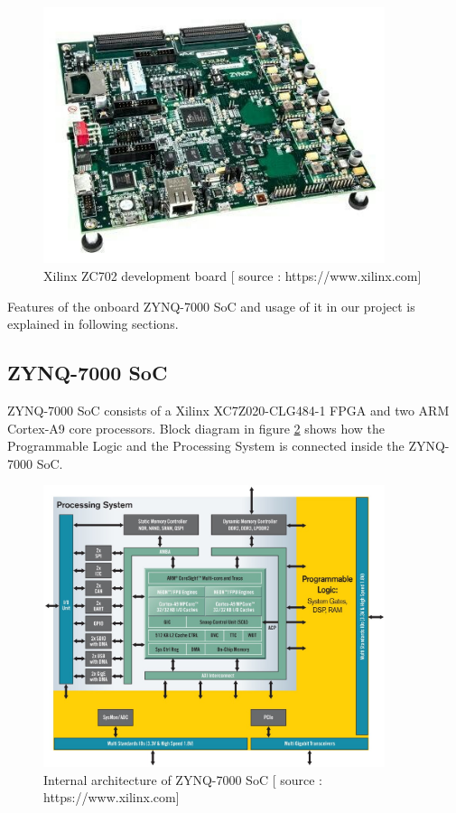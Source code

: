 \documentclass[12pt,a4paper]{report}
\begin{document}
\begin{figure}[H]
\includegraphics[width=10cm]{zc702.jpg}
\centering
\caption{Xilinx ZC702 development board [ source : https://www.xilinx.com]}
\label{board}
\end{figure}


Features of the onboard ZYNQ-7000 SoC and usage of it in our project is explained in following sections.

\subsection{ZYNQ-7000 SoC}
ZYNQ-7000 SoC consists of a Xilinx XC7Z020-CLG484-1 FPGA and two ARM Cortex-A9 core processors. Block diagram in figure \ref{zynq} shows how the Programmable Logic and the Processing System is connected inside the ZYNQ-7000 SoC.

\begin{figure}[H]
\includegraphics[width=10cm]{zynq.jpg}
\centering
\caption{Internal architecture of ZYNQ-7000 SoC [ source : https://www.xilinx.com]}
\label{zynq}
\end{figure}
\end{document}
